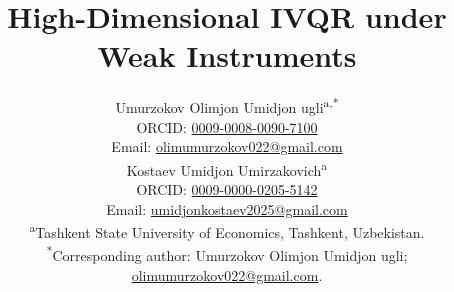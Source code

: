 
\title{High-Dimensional IVQR under Weak Instruments}
\ifdefined\WfourAnonymous\author{}\else
\author{\begin{minipage}{\dimexpr\textwidth-2\tabcolsep\relax}\centering
\normalsize Umurzokov Olimjon Umidjon ugli\textsuperscript{a,*}\\
\small ORCID: \href{https://orcid.org/0009-0008-0090-7100}{0009-0008-0090-7100}\\
Email: \href{mailto:olimumurzokov022@gmail.com}{olimumurzokov022@gmail.com}\\[0.7em]
\normalsize Kostaev Umidjon Umirzakovich\textsuperscript{a}\\
\small ORCID: \href{https://orcid.org/0009-0000-0205-5142}{0009-0000-0205-5142}\\
Email: \href{mailto:umidjonkostaev2025@gmail.com}{umidjonkostaev2025@gmail.com}\\[0.7em]
\textsuperscript{a}Tashkent State University of Economics, Tashkent, Uzbekistan.\\[0.4em]
\textsuperscript{*}Corresponding author: Umurzokov Olimjon Umidjon ugli;\\
\href{mailto:olimumurzokov022@gmail.com}{olimumurzokov022@gmail.com}.
\end{minipage}}
\fi
\date{}
\ifdefined\WfourAnonymous
{}
\else
{}
\fi
\newcommand{\WfourRepository}{\ifdefined\WfourAnonymous
Repository identification is withheld for anonymous review; an editor-approved anonymous evidence deposit is required before submission.
\else
The primary code and selected evidence repository is \url{https://github.com/U-Olim/IVQR-Under-the-Weak-Instruments}, verified through authenticated GitHub access on 23 November 2026 at commit \path{cb0244b019a6458e8806dc9cdf59f1da133de656}. This identifies the selected evidence package, not the present manuscript revision; unauthenticated public accessibility has not been established.
\fi}

